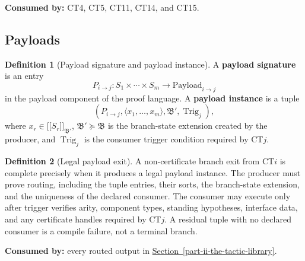 \documentclass[
  11pt,
]{article}
\providecommand{\llbracket}{\mathopen{[\![}}
\providecommand{\rrbracket}{\mathclose{]\!]}}
\theoremstyle{definition}
\newtheorem{definition}{Definition}[section]
\newcommand{\secref}[1]{\hyperref[#1]{Section~\ref*{#1}}}
\begin{document}
\noindent\textbf{Consumed by:} CT4, CT5, CT11, CT14, and CT15.

\subsection{Payloads}\label{data-payloads}
\begin{definition}[Payload signature and payload instance]\label{def:payload-instance}
A \textbf{payload signature} is an entry
\[
P_{i\to j}:S_1\times\cdots\times S_m\longrightarrow
\mathrm{Payload}_{i\to j}
\]
in the payload component of the proof language.  A \textbf{payload
instance} is a tuple
\[
(P_{i\to j},\langle x_1,\ldots,x_m\rangle,\mathfrak B',
  \operatorname{Trig}_{j}),
\]
where \(x_r\in\llbracket S_r\rrbracket_{\mathfrak B'}\),
\(\mathfrak B'\succeq\mathfrak B\) is the branch-state extension
created by the producer, and \(\operatorname{Trig}_{j}\) is the
consumer trigger condition required by CT\(j\).
\end{definition}

\begin{definition}[Legal payload exit]\label{def:legal-payload-exit}
A non-certificate branch exit from CT\(i\) is complete precisely when it
produces a legal payload instance.  The producer must prove routing,
including the tuple entries, their sorts, the branch-state extension,
and the uniqueness of the declared consumer.  The consumer may execute
only after trigger verifies arity, component types, standing hypotheses,
interface data, and any certificate handles required by CT\(j\).  A
residual tuple with no declared consumer is a compile failure, not a
terminal branch.
\end{definition}

\noindent\textbf{Consumed by:} every routed output in
\secref{part-ii-the-tactic-library}.
\end{document}
